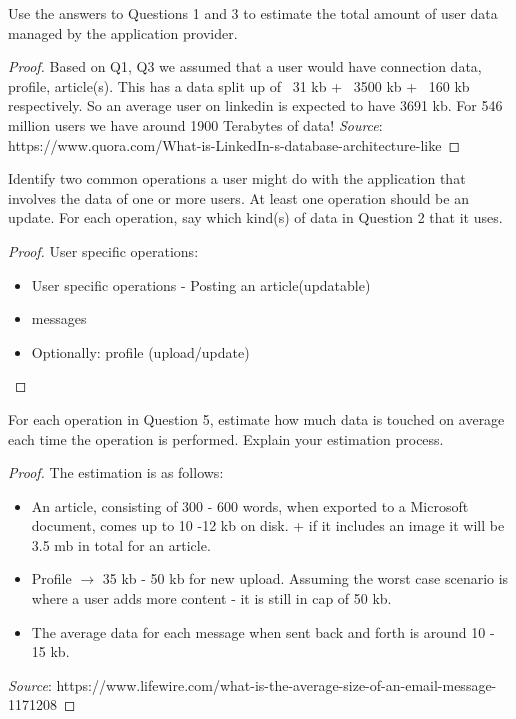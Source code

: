 \documentclass[12pt]{article}
\newenvironment{problem}[2][Problem]{\begin{trivlist}
\item[\hskip \labelsep {\bfseries #1}\hskip \labelsep {\bfseries #2.}]}{\end{trivlist}}
\begin{document}
\begin{problem}{4}
Use the answers to Questions 1 and 3 to estimate the total amount of user data managed by the application provider.
\end{problem}
\begin{proof}
Based on Q1, Q3 we assumed that a user would have connection data, profile, article(s). This has a data split up of ~31 kb + ~3500 kb + ~160 kb respectively. So an average user on linkedin is expected to have 3691 kb. For 546 million users we have around 1900 Terabytes of data!
\newline
\textit{Source}: https://www.quora.com/What-is-LinkedIn-s-database-architecture-like

\end{proof}


\begin{problem}{5}
Identify two common operations a user might do with the application that involves the data of one or more users. At least one operation should be an update. For each operation, say which kind(s) of data in Question 2 that it uses.
\end{problem}
\begin{proof}
User specific operations:
\begin{itemize}
\item User specific operations - Posting an article(updatable)
\item messages
\item Optionally:  profile (upload/update)
\end{itemize}
\end{proof}


\begin{problem}{6}
For each operation in Question 5, estimate how much data is touched on average each time the operation is performed. Explain your estimation process.
\end{problem}
 
\begin{proof}
The estimation is as follows:
\begin{itemize}
\item An article, consisting of 300 - 600 words, when exported to a Microsoft document, comes up to 10 -12 kb on disk. + if it includes an image it will be 3.5 mb in total for an article. 
\item Profile \(\rightarrow\) 35 kb - 50 kb for new upload. Assuming the worst case scenario is where a user adds more content - it is still in cap of 50 kb.
\item The average data for each message when sent back and forth is around 10 - 15 kb.
\end{itemize}

\textit{Source}: https://www.lifewire.com/what-is-the-average-size-of-an-email-message-1171208

\end{proof}
\end{document}
